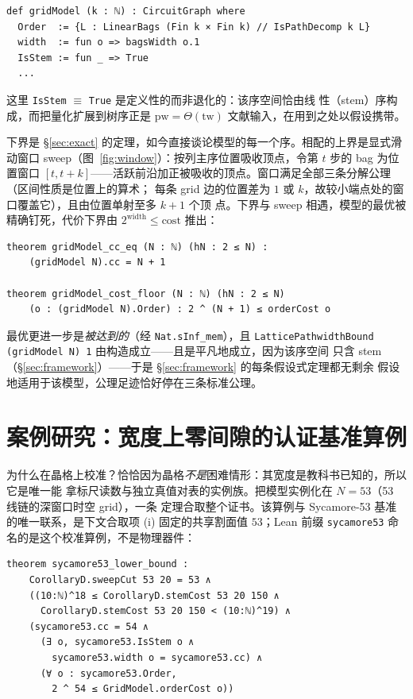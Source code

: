 \documentclass[11pt]{ctexart}
\newcommand{\pw}{\mathrm{pw}}
\newcommand{\tw}{\mathrm{tw}}
\begin{document}
\begin{lstlisting}
def gridModel (k : ℕ) : CircuitGraph where
  Order  := {L : LinearBags (Fin k × Fin k) // IsPathDecomp k L}
  width  := fun o => bagsWidth o.1
  IsStem := fun _ => True
  ...
\end{lstlisting}

\noindent 这里 \texttt{IsStem} $\equiv$ \texttt{True} 是定义性的而非退化的：该序空间恰由线
性（stem）序构成，而把量化扩展到树序正是 $\pw=\Theta(\tw)$ 文献输入，在用到之处以假设携带。

下界是 \S\ref{sec:exact} 的定理，如今直接谈论模型的每一个序。相配的上界是显式滑动窗口
sweep（图~\ref{fig:window}）：按列主序位置吸收顶点，令第 $t$ 步的 bag 为位置窗口
$[t, t+k]$——活跃前沿加正被吸收的顶点。窗口满足全部三条分解公理（区间性质是位置上的算术；
每条 grid 边的位置差为 $1$ 或 $k$，故较小端点处的窗口覆盖它），且由位置单射至多 $k+1$ 个顶
点。下界与 sweep 相遇，模型的最优被精确钉死，代价下界由
$2^{\mathrm{width}}\le\mathrm{cost}$ 推出：

\begin{lstlisting}
theorem gridModel_cc_eq (N : ℕ) (hN : 2 ≤ N) :
    (gridModel N).cc = N + 1

theorem gridModel_cost_floor (N : ℕ) (hN : 2 ≤ N)
    (o : (gridModel N).Order) : 2 ^ (N + 1) ≤ orderCost o
\end{lstlisting}

\noindent 最优更进一步是\emph{被达到的}（经 \texttt{Nat.sInf\_mem}），且
\texttt{LatticePathwidthBound (gridModel N) 1} 由构造成立——且是平凡地成立，因为该序空间
只含 stem（\S\ref{sec:framework}）——于是 \S\ref{sec:framework} 的每条假设式定理都无剩余
假设地适用于该模型，公理足迹恰好停在三条标准公理。

\section{案例研究：宽度上零间隙的认证基准算例}\label{sec:endtoend}

为什么在晶格上校准？恰恰因为晶格\emph{不是}困难情形：其宽度是教科书已知的，所以它是唯一能
拿标尺读数与独立真值对表的实例族。把模型实例化在 $N=53$（53 线链的深窗口时空 grid），一条
定理合取整个证书。该算例与 Sycamore-53 基准的唯一联系，是下文合取项 (i) 固定的共享割面值
$53$；Lean 前缀 \texttt{sycamore53} 命名的是这个校准算例，不是物理器件：

\begin{lstlisting}
theorem sycamore53_lower_bound :
    CorollaryD.sweepCut 53 20 = 53 ∧
    ((10:ℕ)^18 ≤ CorollaryD.stemCost 53 20 150 ∧
      CorollaryD.stemCost 53 20 150 < (10:ℕ)^19) ∧
    (sycamore53.cc = 54 ∧
      (∃ o, sycamore53.IsStem o ∧
        sycamore53.width o = sycamore53.cc) ∧
      (∀ o : sycamore53.Order,
        2 ^ 54 ≤ GridModel.orderCost o))
\end{lstlisting}
\end{document}
